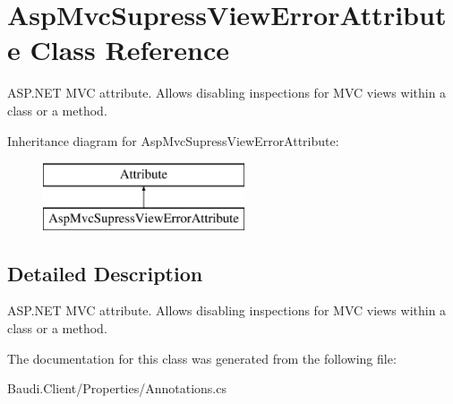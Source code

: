 \hypertarget{class_asp_mvc_supress_view_error_attribute}{}\section{Asp\+Mvc\+Supress\+View\+Error\+Attribute Class Reference}
\label{class_asp_mvc_supress_view_error_attribute}


A\+S\+P.\+N\+E\+T M\+V\+C attribute. Allows disabling inspections for M\+V\+C views within a class or a method.  


Inheritance diagram for Asp\+Mvc\+Supress\+View\+Error\+Attribute\+:\begin{figure}[H]
\begin{center}
\leavevmode
\includegraphics[height=2.000000cm]{class_asp_mvc_supress_view_error_attribute}
\end{center}
\end{figure}


\subsection{Detailed Description}
A\+S\+P.\+N\+E\+T M\+V\+C attribute. Allows disabling inspections for M\+V\+C views within a class or a method. 



The documentation for this class was generated from the following file\+:\begin{DoxyCompactItemize}
\item 
Baudi.\+Client/\+Properties/Annotations.\+cs\end{DoxyCompactItemize}
